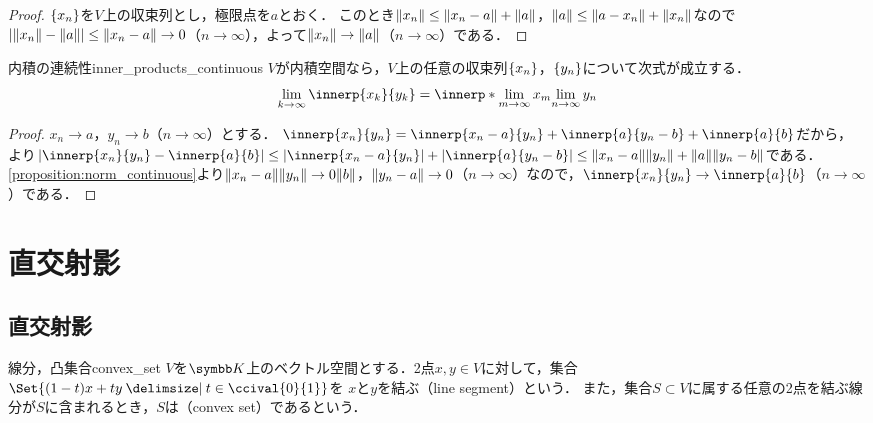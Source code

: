 \documentclass[../../main]{subfiles}
\begin{document}
\begin{proof}
  \(\lbrace x_n\rbrace\)を\(V\)上の収束列とし，極限点を\(a\)とおく．
  このとき\(\lVert x_n\rVert\leq\lVert x_n-a\rVert+\lVert a\rVert\)，\(\lVert a\rVert\leq\lVert a-x_n\rVert+\lVert x_n\rVert\)なので
  \(\lvert\lVert x_n\rVert-\lVert a\rVert\rvert\leq\lVert x_n-a\rVert\to 0\)（\(n\to\infty\)），よって\(\lVert x_n\rVert\to\lVert a\rVert\)（\(n\to\infty\)）である．
\end{proof}

\begin{proposition}{内積の連続性}{inner_products_continuous}
  \(V\)が内積空間なら，\(V\)上の任意の収束列\(\lbrace x_n\rbrace\)，\(\lbrace y_n\rbrace\)について次式が成立する．
  \[
    \lim_{k\to\infty}\innerp{x_k}{y_k} = \innerp*{\lim_{m\to\infty}x_m}{\lim_{n\to\infty}y_n}
  \]
\end{proposition}

\begin{proof}
  \(x_n\to a\)，\(y_n\to b\)（\(n\to\infty\)）とする．
  \(\innerp{x_n}{y_n}=\innerp{x_n-a}{y_n}+\innerp{a}{y_n-b}+\innerp{a}{b}\)だから，
  より\(\abs{\innerp{x_n}{y_n}-\innerp{a}{b}}\leq\abs{\innerp{x_n-a}{y_n}}+\abs{\innerp{a}{y_n-b}}\leq\vnorm{x_n-a}\vnorm{y_n}+\vnorm{a}\vnorm{y_n-b}\)である．
  \cref{proposition:norm_continuous}より\(\lVert x_n-a\rVert\lVert y_n\rVert\to 0\lVert b\rVert\)，\(\lVert y_n-a\rVert\to 0\)（\(n\to\infty\)）なので，\(\innerp{x_n}{y_n}\to\innerp{a}{b}\)（\(n\to\infty\)）である．
\end{proof}

\section{直交射影}

\subsection{直交射影}

\begin{definition}{線分，凸集合}{convex_set}
  \(V\)を\(\numset{K}\)上のベクトル空間とする．2点\(x,y\in V\)に対して，集合\(\Set{(1-t)x+ty\given t\in\ccival{0}{1}}\)を
  \(x\)と\(y\)を結ぶ（line segment）という．
  また，集合\(S\subset V\)に属する任意の2点を結ぶ線分が\(S\)に含まれるとき，\(S\)は（convex set）であるという．
\end{definition}
\end{document}
